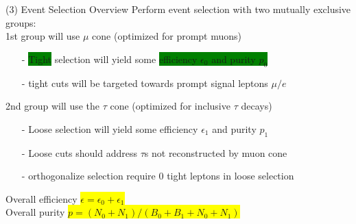\documentclass[10pt]{beamer}
\begin{document}
\begin{frame}{(3) Event Selection Overview}
Perform event selection with two mutually exclusive groups:\\
1st group will use $\mu$ cone (optimized for prompt muons)
	\begin{itemize}
		\scriptsize
		\item[-]\colorbox{green}{Tight} selection will yield some \colorbox{green}{efficiency $\epsilon_0$ and purity $p_0$}
		\item[-] tight cuts will be targeted towards prompt signal leptons $\mu/e$ 
	\end{itemize} 
2nd group will use the $\tau$ cone (optimized for inclusive $\tau$ decays)
	\begin{itemize}
	\scriptsize
		\item[-] \colorbox{emerald}{Loose} selection will yield some \colorbox{emerald}{efficiency $\epsilon_1$ and purity $p_1$}
		\item[-] Loose cuts should address $\tau$s not reconstructed by muon cone
		\item[-] orthogonalize selection require 0 tight leptons in loose selection
	\end{itemize}
Overall efficiency \colorbox{yellow}{$\epsilon = \epsilon_0 + \epsilon_1$}\\
Overall purity \colorbox{yellow}{$p = (N_0 + N_1) / (B_0 + B_1 + N_0 +N_1)$}\\
\quad \quad \\


\end{frame}
\end{document}
